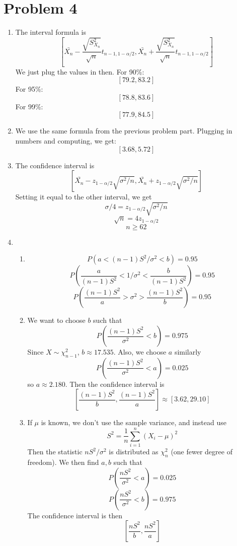 \documentclass[10pt,letter]{article}
\begin{document}
\section*{Problem 4}
\begin{enumerate}[label=(\alph*)]
\item The interval formula is
\[ \left[ \bar{X_n} - \frac{\sqrt{S^2_{X_n}}}{\sqrt{n}} t_{n-1, 1-\alpha/2},\bar{X_n} + \frac{\sqrt{S^2_{X_n}}}{\sqrt{n}} t_{n-1, 1-\alpha/2} \right] \]
We just plug the values in then. For 90\%:
\[ [79.2, 83.2] \]
For 95\%:
\[ [78.8, 83.6] \]
For 99\%:
\[ [77.9, 84.5] \]
\item We use the same formula from the previous problem part. Plugging in numbers and computing, we get:
\[ [3.68, 5.72] \]
\item The confidence interval is
\[ [\bar{X_n} - z_{1-\alpha/2}\sqrt{\sigma^2/n} ,\bar{X_n} + z_{1-\alpha/2}\sqrt{\sigma^2/n} ] \]
Setting it equal to the other interval, we get
\[ \sigma/4 = z_{1-\alpha/2}\sqrt{\sigma^2/n}  \]
\[ \sqrt{n} = 4z_{1-\alpha/2} \]
\[ n \ge 62 \]
\item \begin{enumerate}
\item
\[ P(a < (n-1)S^2/\sigma^2 < b) = 0.95 \]
\[ P\left(\frac{a}{(n-1)S^2} < 1/\sigma^2 < \frac{b}{(n-1)S^2}\right) = 0.95 \]
\[ P\left(\frac{(n-1)S^2}{a} > \sigma^2 > \frac{(n-1)S^2}{b}\right) = 0.95 \]
\item We want to choose $b$ such that
\[ P\left(\frac{(n-1)S^2}{\sigma^2} < b \right) = 0.975 \]
Since $X \sim \chi^2_{n-1}$, $b \approx 17.535$. Also, we choose $a$ similarly
\[ P\left(\frac{(n-1)S^2}{\sigma^2} < a \right) = 0.025 \]
so $a \approx 2.180$.
Then the confidence interval is
\[ \left[ \frac{(n-1)S^2}{b}, \frac{(n-1)S^2}{a} \right] \approx [3.62, 29.10] \]

\item If $\mu$ is known, we don't use the sample variance, and instead use
\[ S^2 = \frac{1}{n} \sum_{i=1}^n (X_i - \mu)^2 \]
Then the statistic $nS^2/\sigma^2$ is distributed as $\chi^2_n$ (one fewer degree of freedom). We then find $a,b$ such that
\[ P\left(\frac{n S^2}{\sigma^2} < a \right) = 0.025 \]
\[ P\left(\frac{n S^2}{\sigma^2} < b \right) = 0.975 \]
The confidence interval is then
\[ \left[ \frac{nS^2}{b}, \frac{nS^2}{a} \right] \]
\end{enumerate}
\end{enumerate}
\end{document}
